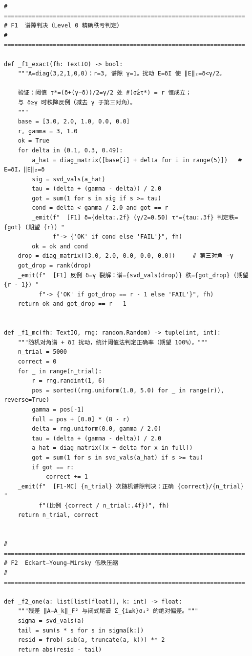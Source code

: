 \documentclass[UTF8,11pt,a4paper]{ctexart}
\theoremstyle{plain}
\theoremstyle{definition}
\theoremstyle{remark}
\begin{document}
\begin{Verbatim}[fontsize=\scriptsize,frame=single,breaklines=true,breakanywhere=true,breaksymbolleft={}]
# =====================================================================
# F1  谱隙判决（Level 0 精确秩亏判定）
# =====================================================================

def _f1_exact(fh: TextIO) -> bool:
    """A=diag(3,2,1,0,0)：r=3, 谱隙 γ=1。扰动 E=δI 使 ‖E‖₂=δ<γ/2。

    验证：阈值 τ*=(δ+(γ−δ))/2=γ/2 处 #(σ̂≥τ*) = r 恒成立；
    与 δ≥γ 时秩降反例（减去 γ 于第三对角）。
    """
    base = [3.0, 2.0, 1.0, 0.0, 0.0]
    r, gamma = 3, 1.0
    ok = True
    for delta in (0.1, 0.3, 0.49):
        a_hat = diag_matrix([base[i] + delta for i in range(5)])   # E=δI，‖E‖₂=δ
        sig = svd_vals(a_hat)
        tau = (delta + (gamma - delta)) / 2.0
        got = sum(1 for s in sig if s >= tau)
        cond = delta < gamma / 2.0 and got == r
        _emit(f"  [F1] δ={delta:.2f} (γ/2=0.50) τ*={tau:.3f} 判定秩={got} (期望 {r}) "
              f"-> {'OK' if cond else 'FAIL'}", fh)
        ok = ok and cond
    drop = diag_matrix([3.0, 2.0, 0.0, 0.0, 0.0])     # 第三对角 −γ
    got_drop = rank(drop)
    _emit(f"  [F1] 反例 δ=γ 裂解：谱={svd_vals(drop)} 秩={got_drop} (期望 {r - 1}) "
          f"-> {'OK' if got_drop == r - 1 else 'FAIL'}", fh)
    return ok and got_drop == r - 1


def _f1_mc(fh: TextIO, rng: random.Random) -> tuple[int, int]:
    """随机对角谱 + δI 扰动，统计阈值法判定正确率（期望 100%）。"""
    n_trial = 5000
    correct = 0
    for _ in range(n_trial):
        r = rng.randint(1, 6)
        pos = sorted((rng.uniform(1.0, 5.0) for _ in range(r)), reverse=True)
        gamma = pos[-1]
        full = pos + [0.0] * (8 - r)
        delta = rng.uniform(0.0, gamma / 2.0)
        tau = (delta + (gamma - delta)) / 2.0
        a_hat = diag_matrix([x + delta for x in full])
        got = sum(1 for s in svd_vals(a_hat) if s >= tau)
        if got == r:
            correct += 1
    _emit(f"  [F1-MC] {n_trial} 次随机谱隙判决：正确 {correct}/{n_trial} "
          f"(比例 {correct / n_trial:.4f})", fh)
    return n_trial, correct


# =====================================================================
# F2  Eckart–Young–Mirsky 低秩压缩
# =====================================================================

def _f2_one(a: list[list[float]], k: int) -> float:
    """残差 ‖A−A_k‖_F² 与闭式尾谱 Σ_{i≥k}σᵢ² 的绝对偏差。"""
    sigma = svd_vals(a)
    tail = sum(s * s for s in sigma[k:])
    resid = frob(_sub(a, truncate(a, k))) ** 2
    return abs(resid - tail)



\end{Verbatim}
\end{document}
